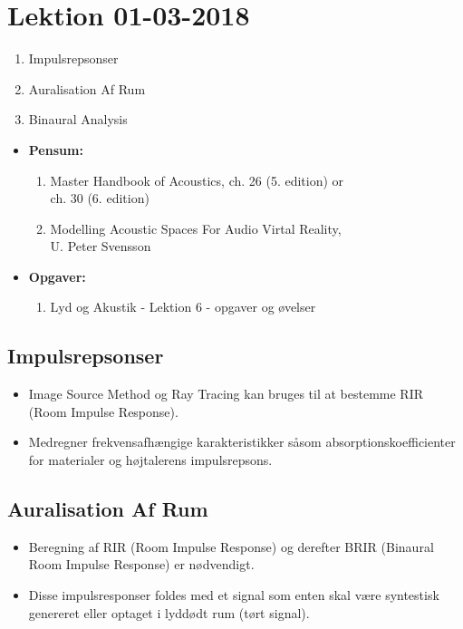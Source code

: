 \section{Lektion 01-03-2018}

\begin{enumerate}
	\item Impulsrepsonser
	\item Auralisation Af Rum
	\item Binaural Analysis
\end{enumerate}

\begin{mdframed}[style=exampledefault]
	\begin{itemize}
		\item \textbf{Pensum:} 
		\begin{enumerate}
			\item Master Handbook of Acoustics, ch. 26 (5. edition) or \\ch. 30 (6. edition)
			\item Modelling Acoustic Spaces For Audio Virtal Reality, \\U. Peter Svensson
		\end{enumerate}
		\item \textbf{Opgaver:} 
		\begin{enumerate}
			\item Lyd og Akustik - Lektion 6 - opgaver og øvelser
		\end{enumerate}
	\end{itemize}
\end{mdframed}

\subsection{Impulsrepsonser}
\begin{itemize}
	\item Image Source Method og Ray Tracing kan bruges til at bestemme RIR (Room Impulse Response).
	\item Medregner frekvensafhængige karakteristikker såsom absorptionskoefficienter for materialer og højtalerens impulsrepsons.
\end{itemize}
\newpage

\subsection{Auralisation Af Rum}
\begin{itemize}
	\item Beregning af RIR (Room Impulse Response) og derefter BRIR (Binaural Room Impulse Response) er nødvendigt.
	\item Disse impulsresponser foldes med et signal som enten skal være syntestisk genereret eller optaget i lyddødt rum (tørt signal). 
\end{itemize}

